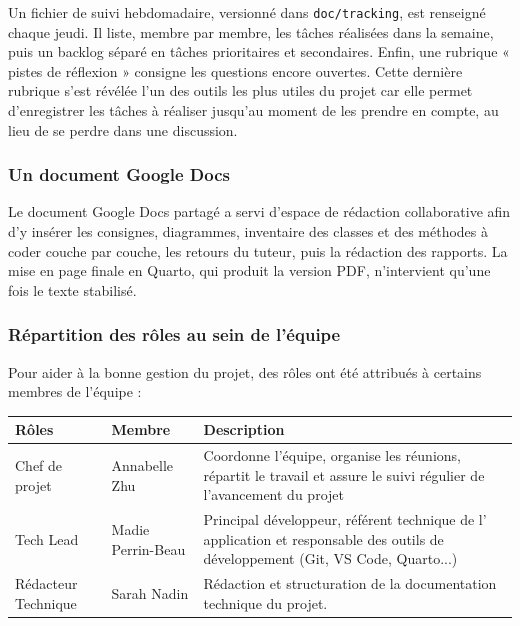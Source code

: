 \documentclass[a4paper,12pt]{article}
\begin{document}
Un fichier de suivi hebdomadaire, versionné dans
\texttt{doc/\allowbreak{}tracking}, est renseigné chaque jeudi. Il
liste, membre par membre, les tâches réalisées dans la semaine, puis un
backlog séparé en tâches prioritaires et secondaires. Enfin, une
rubrique « pistes de réflexion » consigne les questions encore ouvertes.
Cette dernière rubrique s'est révélée l'un des outils les plus utiles du
projet car elle permet d'enregistrer les tâches à réaliser jusqu'au
moment de les prendre en compte, au lieu de se perdre dans une
discussion.

\subsubsection{Un document Google Docs}\label{un-document-google-docs}

Le document Google Docs partagé a servi d'espace de rédaction
collaborative afin d'y insérer les consignes, diagrammes, inventaire des
classes et des méthodes à coder couche par couche, les retours du
tuteur, puis la rédaction des rapports. La mise en page finale en
Quarto, qui produit la version PDF, n'intervient qu'une fois le texte
stabilisé.

\subsubsection{Répartition des rôles au sein de
l'équipe}\label{ruxe9partition-des-ruxf4les-au-sein-de-luxe9quipe}

Pour aider à la bonne gestion du projet, des rôles ont été attribués à
certains membres de l'équipe :

\begin{table}[ht]
\centering
\renewcommand{\arraystretch}{1.5}


\begin{tabularx}{\textwidth}{
|>{\raggedright\arraybackslash}p{3.2cm}
|>{\raggedright\arraybackslash}p{3.5cm}
|>{\raggedright\arraybackslash}X|}
\hline

\rowcolor{headergreen}
\textbf{Rôles} & \textbf{Membre} & \textbf{Description} \\
\hline

\cellcolor{lightblue}
Chef de projet
& Annabelle Zhu
& Coordonne l’équipe, organise les réunions, répartit le
travail et assure le suivi régulier de l’avancement du projet \\
\hline

\cellcolor{lightpink}
Tech Lead
& Madie Perrin-Beau
& Principal développeur, référent technique de
l’ application et responsable des outils de
développement (Git, VS Code, Quarto...) \\
\hline

\cellcolor{lightpurple}
Rédacteur Technique
& Sarah Nadin
& Rédaction et structuration de la documentation
technique du projet. \\
\hline

\end{tabularx}
\end{table}
\end{document}
